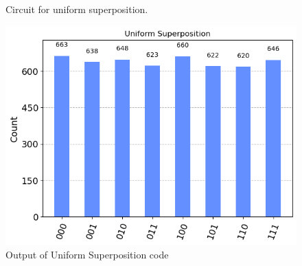 \documentclass{article}
\begin{document}
\begin{figure}[h]

\centering


\caption{Circuit for uniform superposition.}

\end{figure}




\begin{figure}[h]
\centering

\includegraphics[scale=0.5]{code_snippets/uniform_superposition_output.png}


\caption{Output of Uniform Superposition code}

\end{figure}
\end{document}
